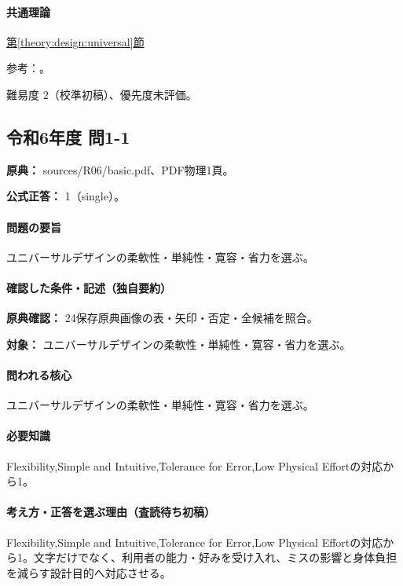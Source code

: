 \paragraph{共通理論} \hyperref[theory:design:universal]{第\ref*{theory:design:universal}節}

\par 参考：\cite{design48_ud}。

\par 難易度 2（校準初稿）、優先度未評価。

\subsection{令和6年度 問1-1}
\label{q:r06-reg-basic-1-1}

\noindent\textbf{原典：} sources/R06/basic.pdf、PDF物理1頁。

\textbf{公式正答：} 1（single）。

\paragraph{問題の要旨} ユニバーサルデザインの柔軟性・単純性・寛容・省力を選ぶ。

\paragraph{確認した条件・記述（独自要約）}\mbox{}\par

\noindent\textbf{原典確認：} 24保存原典画像の表・矢印・否定・全候補を照合。\par

\noindent\textbf{対象：} ユニバーサルデザインの柔軟性・単純性・寛容・省力を選ぶ。\par

\paragraph{問われる核心} ユニバーサルデザインの柔軟性・単純性・寛容・省力を選ぶ。

\paragraph{必要知識} Flexibility,Simple and Intuitive,Tolerance for Error,Low Physical Effortの対応から1。

\paragraph{考え方・正答を選ぶ理由（査読待ち初稿）} Flexibility,Simple and Intuitive,Tolerance for Error,Low Physical Effortの対応から1。文字だけでなく、利用者の能力・好みを受け入れ、ミスの影響と身体負担を減らす設計目的へ対応させる。

